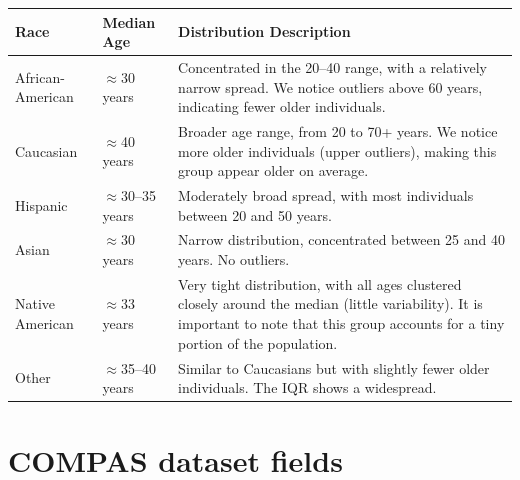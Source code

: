 \documentclass[conference]{IEEEtran}
\begin{document}
	\begin{table}[!ht]
		\centering
		\begin{tabular}{|l|l|p{4cm}|}
			\hline
			Race & Median Age & Distribution Description \\ \hline \hline
			African-American & $\approx$30 years & Concentrated in the 20–40 range, with a relatively narrow spread. We notice outliers above 60 years,  indicating fewer older individuals. \\ \hline
			Caucasian & $\approx$40 years & Broader age range, from 20 to 70+ years. We notice more older individuals (upper outliers), making this group appear older on average. \\ \hline
			Hispanic & $\approx$30–35 years & Moderately broad spread, with most individuals between 20 and 50 years. \\ \hline
			Asian & $\approx$30 years & Narrow distribution, concentrated between 25 and 40 years. No outliers. \\ \hline
			Native American & $\approx$33 years & Very tight distribution, with all ages clustered closely around the median (little variability). It is important to note that this group accounts for a tiny portion of the population. \\ \hline
			Other & $\approx$35–40 years & Similar to Caucasians but with slightly fewer older individuals. The IQR shows a widespread. \\ \hline
		\end{tabular}
	\end{table}


	
	
\printbibliography

\onecolumn
\pagebreak
\appendix 
\section{COMPAS dataset fields}
\end{document}

